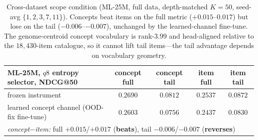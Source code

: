 \documentclass[11pt]{article}
\begin{document}
\begin{table}[h]\centering\small
\begin{tabular}{lcccc}
\toprule
ML-25M, $q8$ entropy selector, NDCG@50 & concept full & concept tail & item full & item tail \\
\midrule
frozen instrument & $0.2690$ & $0.0812$ & $0.2537$ & $0.0872$ \\
learned concept channel (OOD-fix fine-tune) & $0.2603$ & $0.0756$ & $0.2437$ & $0.0830$ \\
\midrule
\multicolumn{5}{l}{\emph{concept$-$item:} full $+0.015$/$+0.017$ (\textbf{beats}), tail $-0.006$/$-0.007$ (\textbf{reverses})}\\
\bottomrule
\end{tabular}
\caption{Cross-dataset scope condition (ML-25M, full data, depth-matched $K{=}50$, seed-avg $\{1,2,3,7,11\}$). Concepts
beat items on the full metric ($+0.015$--$0.017$) but lose on the tail ($-0.006$--$-0.007$), unchanged by the
learned-channel fine-tune. The genome-centroid concept vocabulary is rank-$3.99$ and head-aligned relative to the
$18{,}430$-item catalogue, so it cannot lift tail items---the tail advantage depends on vocabulary geometry.}
\label{tab:ml25m_concitem}
\end{table}
\end{document}
